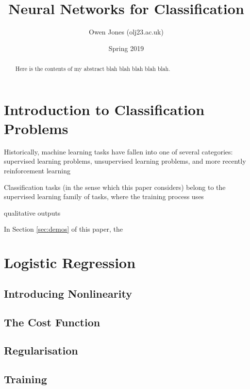 \documentclass{article}[11pt]
\begin{document}
	
	
	\title{Neural Networks for Classification}
	\author{Owen Jones (olj23\@bath.ac.uk)}
	\date{Spring 2019}
	\maketitle


\begin{abstract}
	Here is the contents of my abstract blah blah blah blah blah.
\end{abstract}



\section{Introduction to Classification Problems}

    Historically, machine learning tasks have fallen into one of several categories: supervised learning problems, unsupervised learning problems, and more recently reinforcement learning
    
    Classification tasks (in the sense which this paper considers) belong to the supervised learning family of tasks, where the training process uses
    
    qualitative outputs
    
    In Section \ref{sec:demos} of this paper, the 


\section{Logistic Regression}

    

    \subsection{Introducing Nonlinearity}

    \subsection{The Cost Function}

    \subsection{Regularisation}
    
    \subsection{Training}
    
\end{document}
